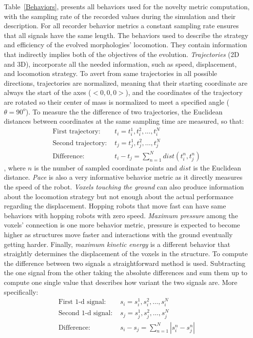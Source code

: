 Table~\ref{Behaviors}, presents all behaviors used for the novelty metric computation, with the sampling rate of the recorded values during the simulation and their description. For all recorder behavior metrics a constant sampling rate ensures that all signals have the same length. The behaviors used to describe the strategy and efficiency of the evolved morphologies' locomotion. They contain information that indirectly implies both of the objectives of the evolution. \emph{Trajectories} (2D and 3D), incorporate all the needed information, such as speed, displacement, and locomotion strategy. To avert from same trajectories in all possible directions, trajectories are normalized, meaning that their starting coordinate are always the start of the axes ($<0,0,0>$), and the coordinates of the trajectory are rotated so their center of mass is normalized to meet a specified angle ($\theta = 90^{o}$). To measure the the difference of two trajectories, the Euclidean distances between coordinates at the same sampling time are measured, so that:
\begin{align}
\text{First trajectory: } &t_i = t_i^1, t_i^2, \ldots, t_i^N\\
\text{Second trajectory: } &t_j = t_j^1, t_j^2, \ldots, t_j^N\\
\text{Difference: } &t_i - t_j = \sum_{n=1}^{N} dist( t_i^n, t_j^n )
\end{align}
, where $n$ is the number of sampled coordinate points and $dist$ is the Euclidean distance. \emph{Pace} is also a very informative behavior metric as it directly measures the speed of the robot. \emph{Voxels touching the ground} can also produce information about the locomotion strategy but not enough about the actual performance regarding the displacement. Hopping robots that move fast can have same behaviors with hopping robots with zero speed. \emph{Maximum pressure} among the voxels' connection is one more behavior metric, pressure is expected to become higher as structures move faster and interactions with the ground eventually getting harder. Finally, \emph{maximum kinetic energy} is a different behavior that straightly determines the displacement of the voxels in the structure. To compute the difference between two signals a straightforward method is used. Subtracting the one signal from the other taking the absolute differences and sum them up to compute one single value that describes how variant the two signals are. More specifically:
\begin{align}
\text{First 1-d signal: } &s_i = s_i^1, s_i^2, \ldots, s_i^N\\
\text{Second 1-d signal: } &s_j = s_j^1, s_j^2, \ldots, s_j^N\\
\text{Difference: } &s_i - s_j = \sum_{n=1}^{N} | s_i^n - s_j^n |
\end{align}

